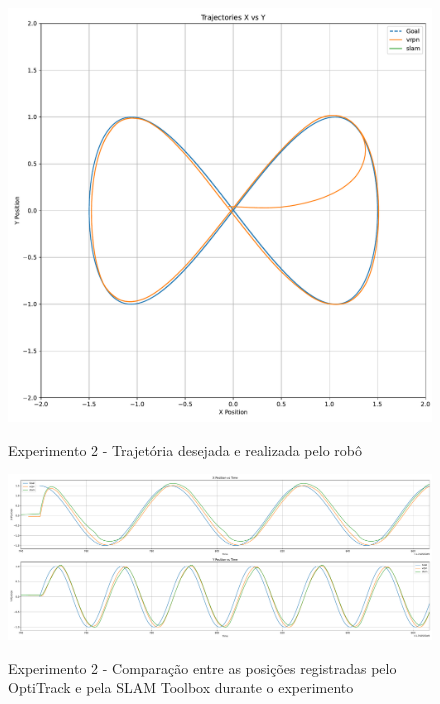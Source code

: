 \begin{figure}
    \centering
    \caption{Experimento 2 - Trajetória desejada e realizada pelo robô}
    \includegraphics[width=0.8\linewidth]{img/Resultados/Exp2_VRPN_Control_LEMNISCATA/Trajetoria_VRPN.pdf}
    \source
    \label{fig:Exp2_TrajetoriaVRPN}
\end{figure}



\begin{figure}
    \centering
    \caption{Experimento 2 - Comparação entre as posições registradas pelo OptiTrack e pela SLAM Toolbox durante o experimento}
    \includegraphics[width=\linewidth]{img/Resultados/Exp2_VRPN_Control_LEMNISCATA/PositionXY_v_Time.pdf}
    \source
    \label{fig:Exp2_Comparacao_Posicao_v_tempo}
\end{figure}

